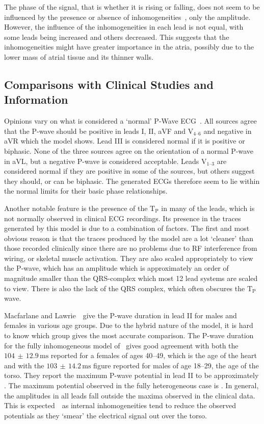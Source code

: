 The phase of the signal, that is whether it is rising or falling, does not seem
to be influenced by the presence or absence of
inhomogeneities~\cite{Ramanathan2001a,Gulrajani1983}, only the amplitude.
However, the influence of the inhomogeneities in each lead is not equal, with
some leads being increased and others decreased.
This suggests that the inhomogeneities might have greater importance in the
atria, possibly due to the lower mass of atrial tissue and its thinner walls.

\subsection{Comparisons with Clinical Studies and Information}

Opinions vary on what is considered a `normal'
P-Wave ECG~\cite{Lipman1994,Conover1996,Hampton1997}.
All sources agree that the P-wave should be positive in leads I, II, aVF and
$\text{V}_{\text{4--6}}$ and negative in aVR which the model shows.
Lead III is considered normal if it is positive or biphasic.
None of the three sources agree on the orientation of a normal P-wave in aVL,
but a negative P-wave is considered acceptable.
Leads $\text{V}_{\text{1--3}}$ are considered normal if they are positive in
some of the sources, but others suggest they should, or can be biphasic.
The generated ECGs therefore seem to lie within the normal limits for their
basic phase relationships.

Another notable feature is the presence of the $\text{T}_{\text{P}}$ in many of
the leads, which is not normally observed in clinical ECG recordings.
Its presence in the traces generated by this model is due to a combination of
factors.
The first and most obvious reason is that the traces produced by the model are a
lot `cleaner' than those recorded clinically since there are no problems due to
RF interference from wiring, or skeletal muscle activation.
They are also scaled appropriately to view the P-wave, which has an
amplitude which is approximately an order of magnitude smaller than the
QRS-complex which most 12 lead systems are scaled to view.
There is also the lack of the QRS complex, which often obscures the
$\text{T}_{\text{P}}$ wave.

Macfarlane and Lawrie~\cite{MacFarlane1989b}\ give the P-wave duration in
lead II for males and females in various age groups.
Due to the hybrid nature of the model, it is hard to know which group gives the
most accurate comparison.
The P-wave duration for the fully inhomogeneous model of \ gives good
agreement with both the $104\,\pm\,12.9\,\text{ms}$ reported for a females of
ages 40--49, which is the age of the heart and with the
$103\,\pm\,14.2\,\text{ms}$ figure reported for males of age 18--29, the age of
the torso.
They report the maximum P-wave potential in lead II to be approximately
.
The maximum potential observed in the fully heterogeneous case is .
In general, the amplitudes in all leads fall outside the maxima observed in the
clinical data.
This is expected~\cite{Ramanathan2001a,Gulrajani1983,Gulrajani1989,Klepfer1997}\ as internal
inhomogeneities tend to reduce the observed potentials as they `smear' the
electrical signal out over the torso.

